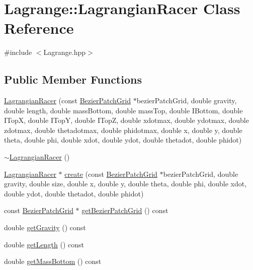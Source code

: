 \hypertarget{class_lagrange_1_1_lagrangian_racer}{\section{Lagrange\-:\-:Lagrangian\-Racer Class Reference}
\label{class_lagrange_1_1_lagrangian_racer}
}


{\ttfamily \#include $<$Lagrange.\-hpp$>$}

\subsection*{Public Member Functions}
\begin{DoxyCompactItemize}
\item 
\hyperlink{class_lagrange_1_1_lagrangian_racer_ae92c8f69443f3674b7e769693de16635}{Lagrangian\-Racer} (const \hyperlink{class_bezier_patch_grid}{Bezier\-Patch\-Grid} $\ast$bezier\-Patch\-Grid, double gravity, double length, double mass\-Bottom, double mass\-Top, double I\-Bottom, double I\-Top\-X, double I\-Top\-Y, double I\-Top\-Z, double xdotmax, double ydotmax, double zdotmax, double thetadotmax, double phidotmax, double x, double y, double theta, double phi, double xdot, double ydot, double thetadot, double phidot)
\item 
\hyperlink{class_lagrange_1_1_lagrangian_racer_afb798998c0432ca5cf2654e97e57c7eb}{$\sim$\-Lagrangian\-Racer} ()
\item 
\hyperlink{class_lagrange_1_1_lagrangian_racer}{Lagrangian\-Racer} $\ast$ \hyperlink{class_lagrange_1_1_lagrangian_racer_a92f67f8a32e94105f10f20c9910e9bab}{create} (const \hyperlink{class_bezier_patch_grid}{Bezier\-Patch\-Grid} $\ast$bezier\-Patch\-Grid, double gravity, double size, double x, double y, double theta, double phi, double xdot, double ydot, double thetadot, double phidot)
\item 
const \hyperlink{class_bezier_patch_grid}{Bezier\-Patch\-Grid} $\ast$ \hyperlink{class_lagrange_1_1_lagrangian_racer_a4145112e6b98ed5fe2e074c16c33267b}{get\-Bezier\-Patch\-Grid} () const 
\item 
double \hyperlink{class_lagrange_1_1_lagrangian_racer_ab65063aa5eaa49d85b9b10fe9f4b5208}{get\-Gravity} () const 
\item 
double \hyperlink{class_lagrange_1_1_lagrangian_racer_a321343be8922996016777cd6ecb566a9}{get\-Length} () const 
\item 
double \hyperlink{class_lagrange_1_1_lagrangian_racer_a3ba71f2ce0d789f86921f293cbf22294}{get\-Mass\-Bottom} () const 

\end{DoxyCompactItemize}
